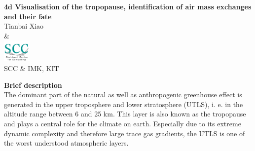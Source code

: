 \documentclass[pagenumoff]{kit-document}
\begin{document}
	
	\begin{center}
		{\bfseries\LARGE 4d Visualisation of the tropopause, identification of air mass exchanges and their fate}\\[1ex]
		Tianbai Xiao
		\\[1ex] \&
		\\\includegraphics[height=3em]{../figs/SCC-LOGO-farbig} %
		\\ \scriptsize SCC \& IMK, KIT
	\end{center}
	
	{\bfseries Brief description}\\
	The dominant part of the natural as well as anthropogenic greenhouse effect is generated in the upper troposphere and lower stratosphere (UTLS), i. e. in the altitude range between 6 and 25 km. This layer is also known as the tropopause and plays a central role for the climate on earth. Especially due to its extreme dynamic complexity and therefore large trace gas gradients, the UTLS is one of the worst understood atmospheric layers.
	
\end{document}
